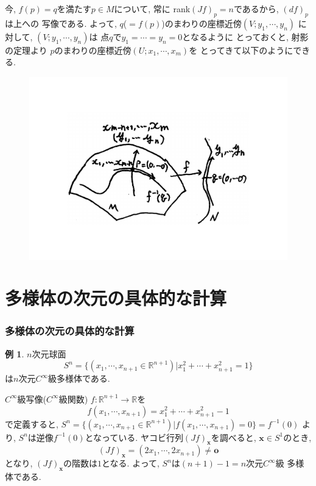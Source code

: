 \documentclass[dvipdfmx,cjk]{beamer}
\theoremstyle{definition}
\newtheorem{ex}{\textbf{ 例 }}
\begin{document}
\begin{frame}
  \frametitle{}
    今, $f(p)=q$を満たす$p\in M$について, 常に
    rank$(Jf)_p=n$であるから, $(df)_p$は上への
    写像である. よって, 
    $q$($=f(p)$)のまわりの座標近傍$(V;y_1,\cdots ,y_n)$
    に対して, $(V;y_1,\cdots ,y_n)$は
    点$q$で$y_1=\cdots =y_n=0$となるように
    とっておくと, 射影の定理より
    $p$のまわりの座標近傍$(U;x_1,\cdots ,x_m)$を
    とってきて以下のようにできる. 
    \begin{figure}[H]
      \centering
      \includegraphics[keepaspectratio, scale=0.35]{finverseIsManifold.pdf}
      \caption{}
      \label{finverseIsManifold}
     \end{figure}
\end{frame}

\section{多様体の次元の具体的な計算}
\begin{frame}
  \frametitle{多様体の次元の具体的な計算}
  \begin{ex}
    $n$次元球面
    $$S^n=\{(x_1,\cdots ,x_{n+1}\in 
    \mathbb{R}^{n+1})|x_1^2+\cdots +x_{n+1}^2=1\}$$
    は$n$次元$C^\infty$級多様体である. 
\end{ex}
$C^\infty$級写像($C^\infty$級関数)
$f:\mathbb{R}^{n+1}\to \mathbb{R}$を
$$f(x_1,\cdots ,x_{n+1})=
x_1^2+\cdots +x_{n+1}^2-1$$
で定義すると, 
$S^n=\{(x_1,\cdots ,x_{n+1}\in 
\mathbb{R}^{n+1})|f(x_1,\cdots ,x_{n+1})=0\}
=f^{-1}(0)$
より, $S^n$は逆像$f^{-1}(0)$となっている. 
ヤコビ行列$(Jf)_{\boldsymbol{x}}$を調べると, 
$\boldsymbol{x}\in S^1$のとき, 
$$(Jf)_{\boldsymbol{x}}=(2x_1,\cdots ,2x_{n+1})
\neq \boldsymbol{o}$$
となり, $(Jf)_{\boldsymbol{x}}$の階数は$1$となる. 
よって, $S^n$は$(n+1)-1=n$次元$C^\infty$級
多様体である. 
\end{frame}
\end{document}
